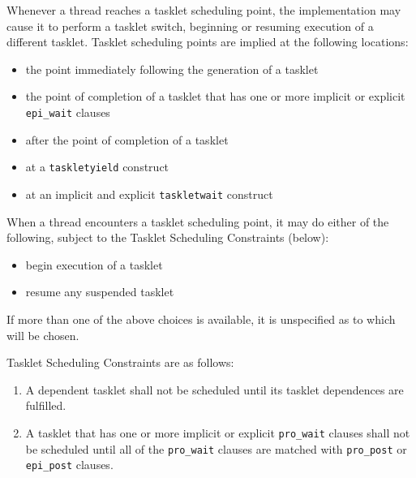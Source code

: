 Whenever a thread reaches a tasklet scheduling point, the implementation
may cause it to perform a tasklet switch, beginning or resuming
execution of a different tasklet. Tasklet scheduling points are implied
at the following locations:

\begin{itemize}
  \item the point immediately following the generation of a tasklet
  \item the point of completion of a tasklet that has one or more
		implicit or explicit \verb|epi_wait| clauses
  \item after the point of completion of a tasklet
  \item at a \verb|taskletyield| construct
  \item at an implicit and explicit \verb|taskletwait| construct
\end{itemize}


When a thread encounters a tasklet scheduling point, it may do either of
the following, subject to the Tasklet Scheduling Constraints (below):

\begin{itemize}
  \item begin execution of a tasklet
  \item resume any suspended tasklet
\end{itemize}

If more than one of the above choices is available, it is unspecified as
to which will be chosen.


Tasklet Scheduling Constraints are as follows:

\begin{enumerate}
  \item A dependent tasklet shall not be scheduled until its tasklet
		dependences are fulfilled.
  \item A tasklet that has one or more implicit or explicit
		\verb|pro_wait| clauses shall not be scheduled until all of the
		\verb|pro_wait| clauses are matched with \verb|pro_post| or
		\verb|epi_post| clauses.
\end{enumerate}

